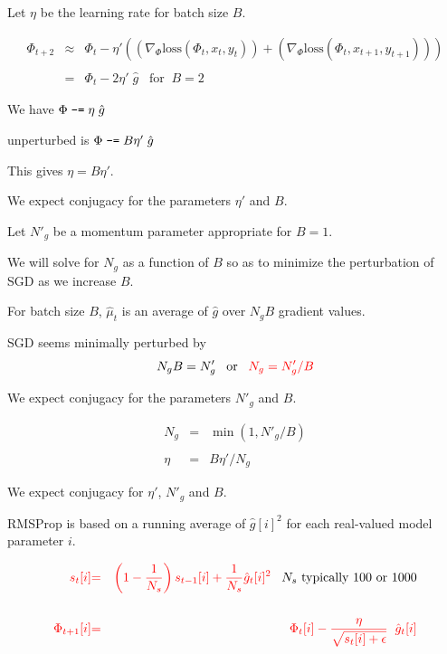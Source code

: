 {

Let $\eta$ be the learning rate for batch size $B$.

\vfill
\begin{eqnarray*}
  \Phi_{t+2} & \approx & \Phi_t - \eta'((\nabla_\Phi \mathrm{loss}(\Phi_t,x_t,y_t)) + (\nabla_\Phi \mathrm{loss}(\Phi_t,x_{t+1},y_{t+1}))) \\
  \\
  & = & \Phi_t - 2\eta'\;\hat{g}\;\;\;\mathrm{for}\;\;B=2
\end{eqnarray*}

\vfill
We have {\color{red} $\Phi \;\mbox{\tt -=} \; \eta\;\hat{g}$}

\vfill
unperturbed is {\color{red} $\Phi \;\mbox{\tt -=} \; B\eta'\;\hat{g}$}

\vfill
This gives {\color{red} $\eta = B \eta'$}.

\vfill
We expect conjugacy for the parameters $\eta'$ and $B$.


Let $N'_g$ be a momentum parameter appropriate for $B=1$.

\vfill
We will solve for $N_g$ as a function of $B$ so as to minimize the perturbation of SGD as we increase $B$.

\vfill
For batch size $B$, $\hat{\mu}_t$ is an average of $\hat{g}$ over $N_gB$ gradient values.

\vfill
SGD seems minimally perturbed by
$$N_gB = N'_g\;\;\;\mbox{or}\;\;\;{\color{red} N_g = N'_g/B}$$

\vfill
We expect conjugacy for the parameters $N'_g$ and $B$.


{\color{red}
\begin{eqnarray*}
N_g & = & \min(1,N'_g/B) \\
\\
\eta & = & B\eta'/N_g
\end{eqnarray*}
}

\vfill
We expect conjugacy for $\eta'$, $N'_g$ and $B$.


RMSProp is based on a running average of $\hat{g}[i]^2$ for each real-valued model parameter $i$.

\begin{eqnarray*}
{\color{red} s_t[i]} & {\color{red} =} & {\color{red} \left(1-\frac{1}{N_s}\right) s_{t-1}[i] + \frac{1}{N_s} \hat{g}_t[i]^2}\;\;\;\mbox{$N_s$ typically 100 or 1000} \\
\\
{\color{red} \Phi_{t+1}[i]} & {\color{red} =} & {\color{red} \Phi_t[i] - \frac{\eta}{\sqrt{s_t[i] + \epsilon}}\;\; \hat{g}_t[i]}
\end{eqnarray*}


}
